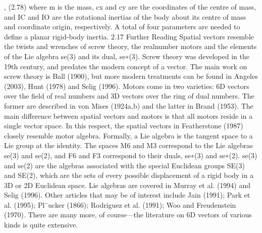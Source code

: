 , (2.78) where m is the mass, cx and cy are the coordinates of the centre of mass, and IC and IO are the rotational inertias of the body about its centre of mass and coordinate origin, respectively. A total of four parameters are needed to define a planar rigid-body inertia. 2.17 Further Reading Spatial vectors resemble the twists and wrenches of screw theory, the realnumber motors and the elements of the Lie algebra se(3) and its dual, se∗(3). Screw theory was developed in the 19th century, and predates the modern concept of a vector. The main work on screw theory is Ball (1900), but more modern treatments can be found in Angeles (2003), Hunt (1978) and Selig (1996). Motors come in two varieties: 6D vectors over the field of real numbers and 3D vectors over the ring of dual numbers. The former are described in von Mises (1924a,b) and the latter in Brand (1953). The main difference between spatial vectors and motors is that all motors reside in a single vector space. In this respect, the spatial vectors in Featherstone (1987) closely resemble motor algebra. Formally, a Lie algebra is the tangent space to a Lie group at the identity. The spaces M6 and M3 correspond to the Lie algebras se(3) and se(2), and F6 and F3 correspond to their duals, se∗(3) and se∗(2). se(3) and se(2) are the algebras associated with the special Euclidean groups SE(3) and SE(2), which are the sets of every possible displacement of a rigid body in a 3D or 2D Euclidean space. Lie algebras are covered in Murray et al. (1994) and Selig (1996). Other articles that may be of interest include Jain (1991); Park et al. (1995); Pl¨ucker (1866); Rodriguez et al. (1991); Woo and Freudenstein (1970). There are many more, of course—the literature on 6D vectors of various kinds is quite extensive.
